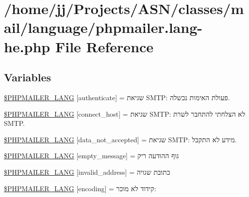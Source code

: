 \hypertarget{phpmailer_8lang-he_8php}{}\section{/home/jj/\+Projects/\+A\+S\+N/classes/mail/language/phpmailer.lang-\/he.php File Reference}
\label{phpmailer_8lang-he_8php}
\subsection*{Variables}
\begin{DoxyCompactItemize}
\item 
\hyperlink{phpmailer_8lang-he_8php_a2cb33073c989b85580748e331ed8b4aa}{\$\+P\+H\+P\+M\+A\+I\+L\+E\+R\+\_\+\+L\+A\+NG} \mbox{[}\textquotesingle{}authenticate\textquotesingle{}\mbox{]} = \textquotesingle{}שגיאת S\+M\+T\+P\+: פעולת האימות נכשלה.\textquotesingle{}
\item 
\hyperlink{phpmailer_8lang-he_8php_a2ee0cc637a06b96e45600db31c6799ee}{\$\+P\+H\+P\+M\+A\+I\+L\+E\+R\+\_\+\+L\+A\+NG} \mbox{[}\textquotesingle{}connect\+\_\+host\textquotesingle{}\mbox{]} = \textquotesingle{}שגיאת S\+M\+T\+P\+: לא הצלחתי להתחבר לשרת S\+M\+T\+P.\textquotesingle{}
\item 
\hyperlink{phpmailer_8lang-he_8php_a814c6b191205d2361b3233e9c9d6fda5}{\$\+P\+H\+P\+M\+A\+I\+L\+E\+R\+\_\+\+L\+A\+NG} \mbox{[}\textquotesingle{}data\+\_\+not\+\_\+accepted\textquotesingle{}\mbox{]} = \textquotesingle{}שגיאת S\+M\+T\+P\+: מידע לא התקבל.\textquotesingle{}
\item 
\hyperlink{phpmailer_8lang-he_8php_a33772099f637c9d6c2cd7425e0e37fed}{\$\+P\+H\+P\+M\+A\+I\+L\+E\+R\+\_\+\+L\+A\+NG} \mbox{[}\textquotesingle{}empty\+\_\+message\textquotesingle{}\mbox{]} = \textquotesingle{}גוף ההודעה ריק\textquotesingle{}
\item 
\hyperlink{phpmailer_8lang-he_8php_a42d61bcea4c79599ecb44fd062f54d47}{\$\+P\+H\+P\+M\+A\+I\+L\+E\+R\+\_\+\+L\+A\+NG} \mbox{[}\textquotesingle{}invalid\+\_\+address\textquotesingle{}\mbox{]} = \textquotesingle{}כתובת שגויה\textquotesingle{}
\item 
\hyperlink{phpmailer_8lang-he_8php_a817f7283f3d54c970a0c10305cc668cc}{\$\+P\+H\+P\+M\+A\+I\+L\+E\+R\+\_\+\+L\+A\+NG} \mbox{[}\textquotesingle{}encoding\textquotesingle{}\mbox{]} = \textquotesingle{}קידוד לא מוכר\+: \textquotesingle{}
\item 

\end{DoxyCompactItemize}
